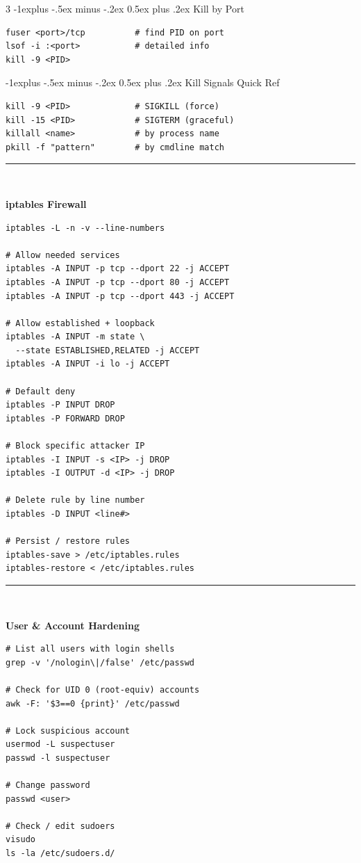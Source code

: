 \documentclass[10pt,landscape]{article}
\makeatletter
\newcommand{\colorsec}[2]{%
  \vspace{1.5ex plus 0.5ex minus 0.5ex}%
  \noindent\rule{\linewidth}{0.4pt}\\[-0.7ex]%
  \noindent\colorbox{#1}{\parbox{\dimexpr\linewidth-2\fboxsep}{%
    \strut\textbf{\normalsize\color{sblue} #2}}}%
  \vspace{0.5ex}\par\nobreak%
}
\renewcommand{\subsection}{\@startsection{subsection}{2}{0mm}%
                                {-1explus -.5ex minus -.2ex}%
                                {0.5ex plus .2ex}%
                                {\normalfont\normalsize\bfseries\color{sblue}}}
\makeatother
\begin{document}
\begin{multicols}{3}
\subsection{Kill by Port}
\begin{lstlisting}
fuser <port>/tcp          # find PID on port
lsof -i :<port>           # detailed info
kill -9 <PID>
\end{lstlisting}

\subsection{Kill Signals Quick Ref}
\begin{lstlisting}
kill -9 <PID>             # SIGKILL (force)
kill -15 <PID>            # SIGTERM (graceful)
killall <name>            # by process name
pkill -f "pattern"        # by cmdline match
\end{lstlisting}

\colorsec{secorange}{iptables Firewall}
\begin{lstlisting}
iptables -L -n -v --line-numbers

# Allow needed services
iptables -A INPUT -p tcp --dport 22 -j ACCEPT
iptables -A INPUT -p tcp --dport 80 -j ACCEPT
iptables -A INPUT -p tcp --dport 443 -j ACCEPT

# Allow established + loopback
iptables -A INPUT -m state \
  --state ESTABLISHED,RELATED -j ACCEPT
iptables -A INPUT -i lo -j ACCEPT

# Default deny
iptables -P INPUT DROP
iptables -P FORWARD DROP

# Block specific attacker IP
iptables -I INPUT -s <IP> -j DROP
iptables -I OUTPUT -d <IP> -j DROP

# Delete rule by line number
iptables -D INPUT <line#>

# Persist / restore rules
iptables-save > /etc/iptables.rules
iptables-restore < /etc/iptables.rules
\end{lstlisting}

\colorsec{secpurple}{User \& Account Hardening}
\begin{lstlisting}
# List all users with login shells
grep -v '/nologin\|/false' /etc/passwd

# Check for UID 0 (root-equiv) accounts
awk -F: '$3==0 {print}' /etc/passwd

# Lock suspicious account
usermod -L suspectuser
passwd -l suspectuser

# Change password
passwd <user>

# Check / edit sudoers
visudo
ls -la /etc/sudoers.d/


\end{lstlisting}
\end{multicols}
\end{document}

